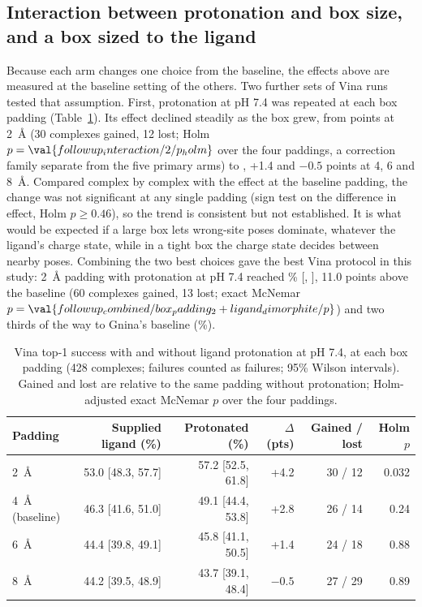 \subsection{Interaction between protonation and box size, and a box sized to the ligand}
\label{sec:interaction}

Because each arm changes one choice from the baseline, the effects above are measured at
the baseline setting of the others. Two further sets of Vina runs tested that assumption.
First, protonation at pH 7.4 was repeated at each box padding (Table~\ref{tab:interaction}).
Its effect declined steadily as the box grew, from  points at \SI{2}{\angstrom} (30
complexes gained, 12 lost; Holm $p = \val{followup_interaction/2/p_holm}$ over the four paddings, a correction family
separate from the five primary arms) to , +1.4 and
$-0.5$ points at 4, 6 and \SI{8}{\angstrom}. Compared complex by complex with the effect at
the baseline padding, the change was not significant at any single padding (sign test on
the difference in effect, Holm $p \ge 0.46$), so the trend is consistent but not
established. It is what would be expected if a large box lets wrong-site poses dominate,
whatever the ligand's charge state, while in a tight box the charge state decides between
nearby poses. Combining the two best choices gave the best Vina protocol in this study:
\SI{2}{\angstrom} padding with protonation at pH 7.4 reached \% [, ], 11.0
points above the baseline (60 complexes gained, 13 lost; exact McNemar
$p = \val{followup_combined/box_padding_2+ligand_dimorphite/p}$) and two thirds of the way to Gnina's baseline (\%).

\begin{table}[h]
  \centering
  \caption{Vina top-1 success with and without ligand protonation at pH 7.4, at each box
    padding (428 complexes; failures counted as failures; 95\% Wilson intervals). Gained
    and lost are relative to the same padding without protonation; Holm-adjusted exact
    McNemar $p$ over the four paddings.}
  \label{tab:interaction}
  \begin{tabular}{lrrrrr}
    \toprule
    Padding & Supplied ligand (\%) & Protonated (\%) & $\Delta$ (pts) & Gained / lost & Holm $p$ \\
    \midrule
    \SI{2}{\angstrom} & 53.0 [48.3, 57.7] & 57.2 [52.5, 61.8] & +4.2 & 30 / 12 & 0.032 \\
    \SI{4}{\angstrom} (baseline) & 46.3 [41.6, 51.0] & 49.1 [44.4, 53.8] & +2.8 & 26 / 14 & 0.24 \\
    \SI{6}{\angstrom} & 44.4 [39.8, 49.1] & 45.8 [41.1, 50.5] & +1.4 & 24 / 18 & 0.88 \\
    \SI{8}{\angstrom} & 44.2 [39.5, 48.9] & 43.7 [39.1, 48.4] & $-0.5$ & 27 / 29 & 0.89 \\
    \bottomrule
  \end{tabular}
\end{table}

